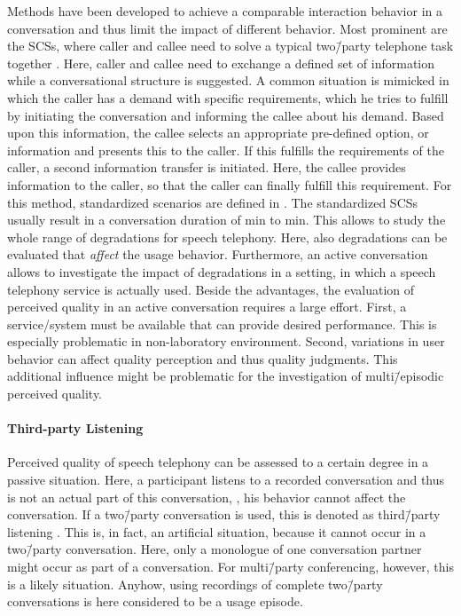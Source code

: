 Methods have been developed to achieve a comparable interaction behavior in a conversation and thus limit the impact of different behavior.
Most prominent are the \acp{SCS}, where caller and callee need to solve a typical two\=/party telephone task together \citep[][p.\,76]{moller_assessment_2000}.
Here, caller and callee need to exchange a defined set of information while a conversational structure is suggested.
A common situation is mimicked in which the caller has a demand with specific requirements, which he tries to fulfill by initiating the conversation and informing the callee about his demand.
Based upon this information, the callee selects an appropriate pre-defined option, or information and presents this to the caller.
If this fulfills the requirements of the caller, a second information transfer is initiated.
Here, the callee provides information to the caller, so that the caller can finally fulfill this requirement.
For this method, standardized scenarios are defined in \citet{itu-t_recommendation_p.805_subjective_2007}.
The standardized \acp{SCS} usually result in a conversation duration of \unit[3]{min} to \unit[7]{min}.
This allows to study the whole range of degradations for speech telephony.
Here, also degradations can be evaluated that \emph{affect} the usage behavior. %
Furthermore, an active conversation allows to investigate the impact of degradations in a setting, in which a speech telephony service is actually used.
Beside the advantages, the evaluation of perceived quality in an active conversation requires a large effort.
First, a service/system must be available that can provide desired performance.
This is especially problematic in non-laboratory environment.
Second, variations in user behavior can affect quality perception and thus quality judgments.
This additional influence might be problematic for the investigation of multi\=/episodic perceived quality.

\paragraph*{Third-party Listening}
Perceived quality of speech telephony can be assessed  to a certain degree in a passive situation.
Here, a participant listens to a recorded conversation and thus is not an actual part of this conversation, \ie, his behavior cannot affect the conversation.
If a two\=/party conversation is used, this is denoted as third\=/party listening \citep[][p.\,13]{itu-t_recommendation_p.832_subjective_2000}.
This is, in fact, an artificial situation, because it cannot occur in a two\=/party conversation.
Here, only a monologue of one conversation partner might occur as part of a conversation.
For multi\=/party conferencing, however, this is a likely situation.
Anyhow, using recordings of complete two\=/party conversations is here considered to be a usage episode.

